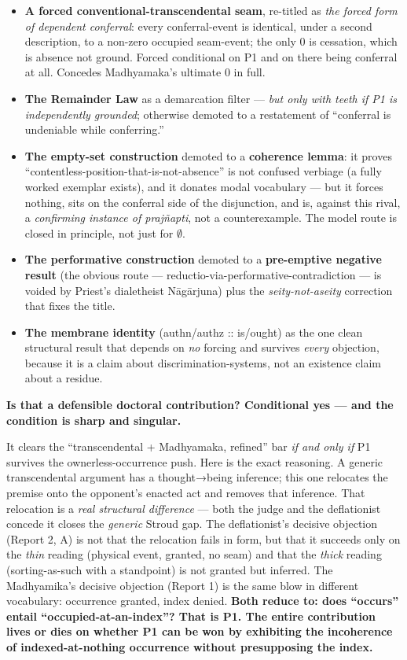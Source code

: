 \documentclass[11pt]{article}
\begin{document}
\begin{itemize}
\item \textbf{A forced conventional-transcendental seam}, re-titled as \emph{the forced form of dependent conferral}: every conferral-event is identical, under a second description, to a non-zero occupied seam-event; the only 0 is cessation, which is absence not ground. Forced conditional on P1 and on there being conferral at all. Concedes Madhyamaka's ultimate 0 in full.
\item \textbf{The Remainder Law} as a demarcation filter — \emph{but only with teeth if P1 is independently grounded}; otherwise demoted to a restatement of ``conferral is undeniable while conferring.''
\item \textbf{The empty-set construction} demoted to a \textbf{coherence lemma}: it proves ``contentless-position-that-is-not-absence'' is not confused verbiage (a fully worked exemplar exists), and it donates modal vocabulary — but it forces nothing, sits on the conferral side of the disjunction, and is, against this rival, a \emph{confirming instance of prajñapti}, not a counterexample. The model route is closed in principle, not just for \ensuremath{\emptyset}.
\item \textbf{The performative construction} demoted to a \textbf{pre-emptive negative result} (the obvious route — reductio-via-performative-contradiction — is voided by Priest's dialetheist Nāgārjuna) plus the \emph{seity-not-aseity} correction that fixes the title.
\item \textbf{The membrane identity} (authn/\allowbreak{}authz :: is/\allowbreak{}ought) as the one clean structural result that depends on \emph{no} forcing and survives \emph{every} objection, because it is a claim about discrimination-systems, not an existence claim about a residue.
\end{itemize}

\textbf{Is that a defensible doctoral contribution? Conditional yes — and the condition is sharp and singular.}

It clears the ``transcendental + Madhyamaka, refined'' bar \emph{if and only if} P1 survives the ownerless-occurrence push. Here is the exact reasoning. A generic transcendental argument has a thought→being inference; this one relocates the premise onto the opponent's enacted act and removes that inference. That relocation is a \emph{real structural difference} — both the judge and the deflationist concede it closes the \emph{generic} Stroud gap. The deflationist's decisive objection (Report 2, A) is not that the relocation fails in form, but that it succeeds only on the \emph{thin} reading (physical event, granted, no seam) and that the \emph{thick} reading (sorting-as-such with a standpoint) is not granted but inferred. The Madhyamika's decisive objection (Report 1) is the same blow in different vocabulary: occurrence granted, index denied. \textbf{Both reduce to: does ``occurs'' entail ``occupied-at-an-index''? That is P1. The entire contribution lives or dies on whether P1 can be won by exhibiting the incoherence of indexed-at-nothing occurrence without presupposing the index.}
\end{document}
